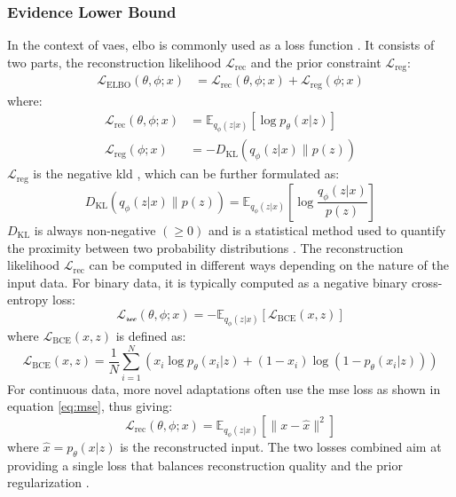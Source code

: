 \subsubsection{Evidence Lower Bound}
\label{back:elbo}
In the context of \acrshort{vae}s, \acrshort{elbo} is commonly used as a loss function \cite{lygerakis2024edvaeentropydecompositionelbo}. It consists of two parts, the reconstruction likelihood $\mathcal{L}_{\text{rec}}$ and the prior constraint $\mathcal{L}_{\text{reg}}$:
\begin{align}
\mathcal{L}_{\text{ELBO}}(\theta, \phi; x) &= \mathcal{L}_{\text{rec}}(\theta, \phi; x) + \mathcal{L}_{\text{reg}}(\phi; x)  
\end{align}
where:
\begin{align}
\mathcal{L}_{\text{rec}}(\theta, \phi; x) &= \mathbb{E}_{q_\phi(z|x)}[\log p_\theta(x|z)] \\
\mathcal{L}_{\text{reg}}(\phi; x) &= -D_{\text{KL}}(q_\phi(z|x) \| p(z))
\end{align}
$\mathcal{L}_{\text{reg}}$ is the negative \acrfull{kld} \cite{10.1214/aoms/1177729694}, which can be further formulated as:
\begin{equation}
    D_{\text{KL}}(q_\phi(z|x) \| p(z)) = \mathbb{E}_{q_\phi(z|x)}\left[\log \frac{q_\phi(z|x)}{p(z)}\right]
\end{equation}
$D_{\text{KL}}$ is always non-negative $(\geq 0)$ and is a statistical method used to quantify the proximity between two probability distributions \cite{shlens2014notes}. 
The reconstruction likelihood $\mathcal{L}_{\text{rec}}$ can be computed in different ways depending on the nature of the input data. For binary data, it is typically computed as a negative binary cross-entropy loss:
\begin{equation}
\mathcal{L_\text{rec}}(\theta, \phi; x) = - \mathbb{E}_{q_\phi(z|x)}[\mathcal{L}_{\text{BCE}}(x, z)]
\end{equation}
where $\mathcal{L}_{\text{BCE}}(x, z)$ is defined as:
\begin{equation}
\mathcal{L}_{\text{BCE}}(x, z) = \frac{1}{N} \sum_{i=1}^{N} \left( x_i \log p_\theta(x_i|z) + (1 - x_i) \log(1 - p_\theta(x_i|z)) \right)
\end{equation}
For continuous data, more novel adaptations \cite{lygerakis2024edvaeentropydecompositionelbo} often use the \acrshort{mse} loss as shown in equation \ref{eq:mse}, thus giving:
\begin{equation}
    \mathcal{L}_{\text{rec}}(\theta, \phi; x) = \mathbb{E}_{q_\phi(z|x)}[\|x - \hat{x}\|^2]
\end{equation}
where $\hat{x} = p_\theta(x|z)$ is the reconstructed input.
The two losses combined aim at providing a single loss that balances reconstruction quality and the prior regularization \cite{lin2019balancingreconstructionqualityregularisation}.

